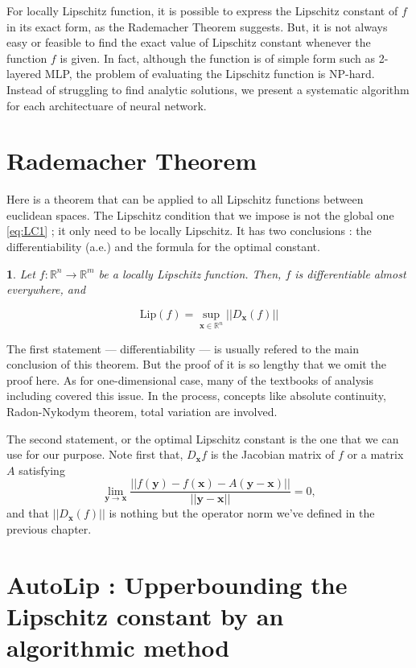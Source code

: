 \documentclass[12pt]{report}
\numberwithin{figure}{chapter}
\theoremstyle{plain}
\newtheorem{theorem}{\protect\theoremname}[chapter]
\theoremstyle{definition}
\theoremstyle{corollary}
\theoremstyle{definition}
\theoremstyle{plain}
\theoremstyle{definition}
\theoremstyle{plain}
\providecommand{\theoremname}{Theorem}
\newcommand\bx{\ensuremath{\boldsymbol x}}
\newcommand\by{\ensuremath{\boldsymbol y}}
\newcommand\lip{\ensuremath{\text{Lip}}}
\begin{document}
For locally Lipschitz function, it is possible to express the Lipschitz constant of \(f\) in its exact form, as the Rademacher Theorem suggests.
But, it is not always easy or feasible to find the exact value of Lipschitz constant whenever the function \(f\) is given.
In fact, although the function is of simple form such as 2-layered MLP, the problem of evaluating the Lipschitz function is NP-hard.
Instead of struggling to find analytic solutions, we present a systematic algorithm for each architectuare of neural network.

\section{Rademacher Theorem}
Here is a theorem that can be applied to all Lipschitz functions between euclidean spaces.
The Lipschitz condition that we impose is not the global one \eqref{eq:LC1} ; it only need to be locally Lipschitz.
It has two conclusions : the differentiability (a.e.) and the formula for the optimal constant.

\begin{theorem}\label{theo:Rademacher}
Let \(f:\mathbb R^n\to\mathbb R^m\) be a locally Lipschitz function.
Then,
\(f\) is differentiable almost everywhere, and
\end{theorem}
\begin{equation}
\lip(f) = \sup_{\bx\in\mathbb R^n}||D_{\bx}(f)||
\end{equation}

The first statement --- differentiability --- is usually refered to the main conclusion of this theorem.
But the proof of it is so lengthy that we omit the proof here.
As for one-dimensional case, many of the textbooks of analysis including \cite{WR} covered this issue.
In the process, concepts like absolute continuity, Radon-Nykodym theorem, total variation are involved.

The second statement, or the optimal Lipschitz constant is the one that we can use for our purpose.
Note first that, \(D_{\bx}f\) is the Jacobian matrix of \(f\) or a matrix \(A\) satisfying
\[\lim_{\by\to\bx}\frac{||f(\by)-f(\bx)-A(\by-\bx)||}{||\by-\bx||}=0,\]
and that \(||D_{\bx}(f)||\) is nothing but the operator norm we've defined in the previous chapter.

\section{AutoLip : Upperbounding the Lipschitz constant by an algorithmic method}
\end{document}
